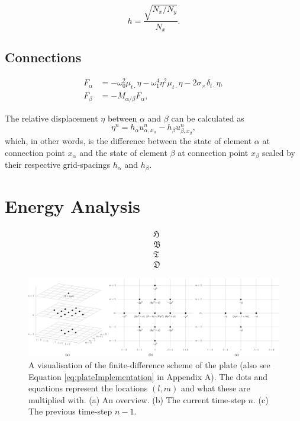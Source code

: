 \documentclass{article}
\begin{document}
\begin{equation}
    h = \frac{\sqrt{N_x / N_y}}{N_x}.
\end{equation}

\subsection{Connections}
\begin{align}
    F_\alpha &= -\omega_0^2\mu_{t\cdot}\eta - \omega_1^4\eta^2\mu_{t\cdot}\eta - 2\sigma_\times\delta_{t\cdot}\eta,\\
    F_\beta &= -M_{\alpha/\beta}F_\alpha,
\end{align}

The relative displacement $\eta$ between $\alpha$ and $\beta$ can be calculated as
\begin{equation}
    \eta^n = h_\alpha u_{\alpha, x_\alpha}^n - h_\beta u_{\beta,x_\beta}^n,
\end{equation}
which, in other words, is the difference between the state of element $\alpha$ at connection point $x_\alpha$ and the state of element $\beta$ at connection point $x_\beta$ scaled by their respective grid-spacings $h_\alpha$ and $h_\beta$.


\section{Energy Analysis}\label{sec:energy}

\begin{equation}
\begin{aligned}
    &\mathfrak{H}\\
    &\mathfrak{B}\\
    &\mathfrak{T}\\
    &\mathfrak{D}
\end{aligned}
\end{equation}

\begin{figure}[t]
    \centering
    \includegraphics[width=2.1\columnwidth]{FullPlate}
    \caption{A visualisation of the finite-difference scheme of the plate (also see Equation \eqref{eq:plateImplementation} in Appendix A). The dots and equations represent the locations $(l,m)$ and what these are multiplied with. (a) An overview. (b) The current time-step $n$. (c) The previous time-step $n-1$. \label{fig:plateFDS}}
 \end{figure}
\end{document}
